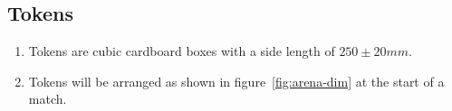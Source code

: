 \subsection{Tokens}
\label{sub:Tokens}
\begin{enumerate}
\item Tokens are cubic cardboard boxes with a side length of $250 \pm 20 mm$.

\item Tokens will be arranged as shown in figure~\ref{fig:arena-dim} at the start of a match.

\end{enumerate}

\clearpage
